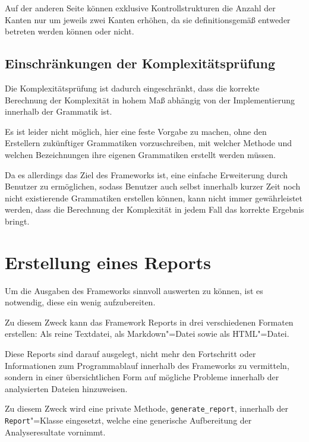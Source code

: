         Auf der anderen Seite können exklusive Kontrollstrukturen die Anzahl der Kanten nur um jeweils zwei Kanten erhöhen,
        da sie definitionsgemäß entweder betreten werden können oder
        nicht.

        \subsection{Einschränkungen der Komplexitätsprüfung}
            Die Komplexitätsprüfung ist dadurch eingeschränkt,
            dass die korrekte Berechnung der Komplexität in hohem Maß abhängig von der Implementierung innerhalb der Grammatik ist.

            Es ist leider nicht möglich,
            hier eine feste Vorgabe zu machen,
            ohne den Erstellern zukünftiger Grammatiken vorzuschreiben,
            mit welcher Methode und
            welchen Bezeichnungen ihre eigenen Grammatiken erstellt werden müssen.

            Da es allerdings das Ziel des Frameworks ist,
            eine einfache Erweiterung durch Benutzer zu ermöglichen,
            sodass Benutzer auch selbst innerhalb kurzer Zeit noch nicht existierende Grammatiken erstellen können,
            kann nicht immer gewährleistet werden,
            dass die Berechnung der Komplexität in jedem Fall das korrekte Ergebnis bringt.

    \section{Erstellung eines Reports}\label{Erstellung eines Reports}
        Um die Ausgaben des Frameworks sinnvoll auswerten zu können,
        ist es notwendig,
        diese ein wenig aufzubereiten.

        Zu diesem Zweck kann das Framework Reports in drei verschiedenen Formaten erstellen:
        Als reine Textdatei,
        als Markdown"=Datei sowie
        als
        \gls{HTML}"=Datei.

        Diese Reports sind darauf ausgelegt,
        nicht mehr den Fortschritt oder
        Informationen zum Programmablauf innerhalb des Frameworks zu vermitteln,
        sondern in einer übersichtlichen Form auf mögliche Probleme innerhalb der analysierten Dateien hinzuweisen.

        Zu diesem Zweck wird eine private Methode,
        \lstinline{generate_report},
        innerhalb der
        \lstinline{Report}"=Klasse eingesetzt,
        welche eine generische Aufbereitung der Analyseresultate vornimmt.

